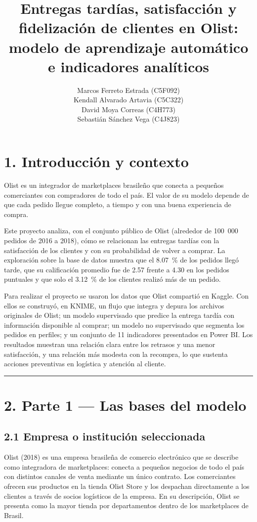 \documentclass[a4paper,stu,12pt,donotrepeattitle,floatsintext]{apa7}
\title{Entregas tardías, satisfacción y fidelización de clientes en Olist: modelo de aprendizaje automático e indicadores analíticos}
\author{Marcos Ferreto Estrada (C5F092)\\ Kendall Alvarado Artavia (C5C322)\\ David Moya Correas (C4H773)\\ Sebastián Sánchez Vega (C4J823)}
\affiliation{Universidad de Costa Rica, Sede de Occidente, Recinto de Grecia}
\begin{document}
\maketitle
\singlespacing
\clearpage
\tableofcontents
\newpage
\section{1. Introducción y contexto}
Olist es un integrador de marketplaces brasileño que conecta a pequeños comerciantes con compradores de todo el país. El valor de su modelo depende de que cada pedido llegue completo, a tiempo y con una buena experiencia de compra.

Este proyecto analiza, con el conjunto público de Olist (alrededor de 100~000 pedidos de 2016 a 2018), cómo se relacionan las entregas tardías con la satisfacción de los clientes y con su probabilidad de volver a comprar. La exploración sobre la base de datos muestra que el 8.07~\% de los pedidos llegó tarde, que su calificación promedio fue de 2.57 frente a 4.30 en los pedidos puntuales y que solo el 3.12~\% de los clientes realizó más de un pedido.

Para realizar el proyecto se usaron los datos que Olist compartió en Kaggle. Con ellos se construyó, en KNIME, un flujo que integra y depura los archivos originales de Olist; un modelo supervisado que predice la entrega tardía con información disponible al comprar; un modelo no supervisado que segmenta los pedidos en perfiles; y un conjunto de 11 indicadores presentados en Power BI. Los resultados muestran una relación clara entre los retrasos y una menor satisfacción, y una relación más modesta con la recompra, lo que sustenta acciones preventivas en logística y atención al cliente.

\medskip\noindent\rule{\linewidth}{0.4pt}\medskip
\section{2. Parte 1 — Las bases del modelo}
\subsection{2.1 Empresa o institución seleccionada}
Olist (2018) es una empresa brasileña de comercio electrónico que se describe como integradora de marketplaces: conecta a pequeños negocios de todo el país con distintos canales de venta mediante un único contrato. Los comerciantes ofrecen sus productos en la tienda Olist Store y los despachan directamente a los clientes a través de socios logísticos de la empresa. En su descripción, Olist se presenta como la mayor tienda por departamentos dentro de los marketplaces de Brasil.
\end{document}
